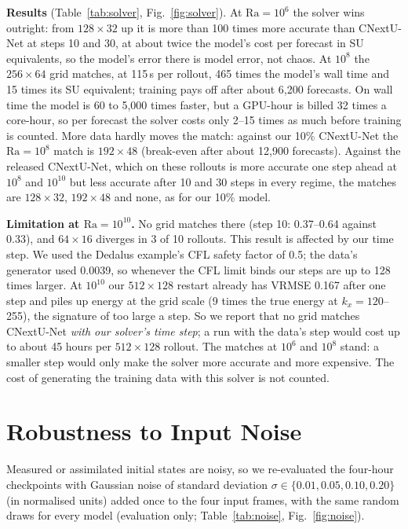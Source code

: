 \documentclass[11pt]{article}
\begin{document}
\textbf{Results} (Table~\ref{tab:solver}, Fig.~\ref{fig:solver}). At $\mathrm{Ra}=10^6$ the solver wins outright: from
$128\times32$ up it is more than 100 times more accurate than CNextU-Net at steps 10 and 30, at about twice the
model's cost per forecast in SU equivalents, so the model's error there is model error, not chaos. At $10^8$ the
$256\times64$ grid matches, at 115\,s per rollout, 465 times the model's wall time and 15 times its SU equivalent;
training pays off after about 6,200 forecasts. On wall time the model is 60 to 5,000 times faster, but a GPU-hour is
billed 32 times a core-hour, so per forecast the solver costs only 2--15 times as much before training is counted.
More data hardly moves the match: against our 10\% CNextU-Net the $\mathrm{Ra}=10^8$ match is $192\times48$ (break-even
after about 12,900 forecasts). Against the released CNextU-Net, which on these rollouts is more accurate one step ahead
at $10^8$ and $10^{10}$ but less accurate after 10 and 30 steps in every regime, the matches are $128\times32$,
$192\times48$ and none, as for our 10\% model.

\textbf{Limitation at $\mathrm{Ra}=10^{10}$.} No grid matches there (step 10: 0.37--0.64 against 0.33), and
$64\times16$ diverges in 3 of 10 rollouts. This result is affected by our time step. We used the Dedalus example's CFL
safety factor of 0.5; the data's generator used 0.0039, so whenever the CFL limit binds our steps are up to 128 times
larger. At $10^{10}$ our $512\times128$ restart already has VRMSE 0.167 after one step and piles up energy at the grid
scale (9 times the true energy at $k_x=120$--255), the signature of too large a step. So we report that no grid matches
CNextU-Net \emph{with our solver's time step}; a run with the data's step would cost up to about 45 hours per
$512\times128$ rollout. The matches at $10^6$ and $10^8$ stand: a smaller step would only make the solver more accurate
and more expensive. The cost of generating the training data with this solver is not counted.

\section{Robustness to Input Noise}
\label{sec:noise}

Measured or assimilated initial states are noisy, so we re-evaluated the four-hour checkpoints with Gaussian noise of
standard deviation $\sigma\in\{0.01, 0.05, 0.10, 0.20\}$ (in normalised units) added once to the four input frames,
with the same random draws for every model (evaluation only; Table~\ref{tab:noise}, Fig.~\ref{fig:noise}).
\end{document}
